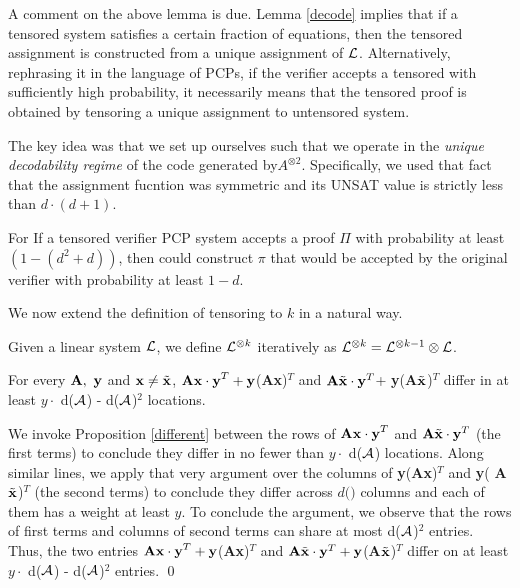 {\noindent A comment on the above lemma is due. Lemma \ref{decode}
implies that if a tensored system satisfies a certain fraction of
equations, then the tensored assignment is constructed from a unique
assignment of ${\cal L}$.  Alternatively, rephrasing it in the language of
PCPs, if the verifier accepts a tensored with sufficiently high
probability, it necessarily means that the tensored proof is obtained
by tensoring a unique assignment to untensored system.

The key idea was that we set up ourselves such that we operate in the
{\em unique decodability regime} of the code generated by$A^{\otimes
  2}$. Specifically, we used that fact that the assignment fucntion
was symmetric and its UNSAT value is strictly less than $d \cdot (d +
1)$.


\begin{corollary}
  For If a tensored verifier PCP system accepts a proof $\Pi$ with
  probability at least $(1 - (d^2 +d))$, then could construct ${\pi}$
  that would be accepted by the original verifier with probability at
  least $1 - d$.
\end{corollary}


We now extend the definition of tensoring to $k$ in a natural way.
\begin{definition}
  Given a linear system ${\cal L}$, we define ${\cal L}^{\otimes k}$ iteratively
  as ${\cal L}^{\otimes k} = {\cal L}^{\otimes k-1} \otimes {\cal L}$.
\end{definition}





\begin{proposition}\label{nearly-there}
  For every ${\bf A,\ y}$ and ${\bf x} \ne \tilde{\bf x}$, ${\bf
    Ax\cdot y}^T + {\bf y}$({\bf Ax})$^T$ and ${\bf A} \tilde{\bf x}\cdot
    {\bf y}^T$+ {\bf y}({\bf A}$\tilde{\bf x}$)$^T$ differ in at least $y
  \cdot$ d(${\cal A}$) - d(${\cal A}$)$^2$ locations.
\end{proposition}
  We invoke Proposition \ref{different} between
the rows of ${\bf Ax\cdot y}^T$ and ${\bf A} \tilde{\bf x}\cdot {\bf
  y}^T$ (the first terms) to conclude they differ in no fewer than $y
\cdot$ d(${\cal A}$) locations. Along similar lines, we apply that very
argument over the columns of {\bf y}({\bf Ax})$^T$ and {\bf y}({\bf
  A}$\tilde{\bf x}$)$^T$ (the second terms) to conclude they differ
across $d($\A$)$ columns and each of them has a weight at least $y$.
To conclude the argument, we observe that the rows of first terms and
columns of second terms can share at most d(${\cal A}$)$^2$ entries. Thus,
the two entries ${\bf Ax\cdot y}^T + {\bf y}$({\bf Ax})$^T$ and ${\bf
  A} \tilde{\bf x}\cdot {\bf y}^T + {\bf y}$({\bf A}$\tilde{\bf
  x}$)$^T$ differ on at least $y \cdot$ d(${\cal A}$) - d(${\cal A}$)$^2$
entries. \qed


}
